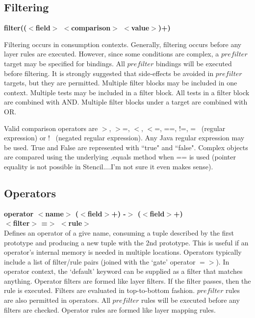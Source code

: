 \documentclass{article}
\begin{document}
\subsection{Filtering}
\textbf{filter(($<$field$>$ $<$comparison$>$ $<$value$>$)+)}

Filtering occurs in consumption contexts.  
Generally, filtering occurs before any layer rules are executed.  However,
since some conditions are complex, a $prefilter$ target may be specified for
bindings.  All $prefilter$ bindings will be executed before filtering.  It is strongly suggested
that side-effects be avoided in $prefilter$ targets, but they are permitted.
Multiple filter blocks may be included in one context.  Multiple tests may be included
 in a filter block.  All tests in a filter block are combined with AND.  Multiple filter
 blocks under a target are combined with OR.
 
Valid comparison operators are $>$, $>$=, $<$, $<$=, ==, !=, =~ (regular expression) or !~ (negated regular expression).
Any Java regular expression may be used.  True and False are represented with ``true" and ``false".
Complex objects are compared using the underlying .equals method when == is used 
(pointer equality is not possible in Stencil....I'm not sure it even makes sense).

\subsection{Operators}
\textbf{operator $<$name$>$ ($<$field$>$+) -$>$ ($<$field$>$+)}\\
\textbf{$<$filter$>$ =$>$ $<$rule$>$}\\
Defines an operator of a give name, consuming a tuple described by the first prototype and producing a new tuple with the 2nd prototype.  
This is useful if an operator's internal memory is needed in multiple locations.
Operators typically include a list of filter/rule pairs (joined with the `gate' operator $=>$).
In operator context, the `default' keyword can be supplied as a filter that matches anything.
Operator filters are formed like layer filters.  If the filter passes, then the rule is executed.  Filters are evaluated in top-to-bottom fashion.
$prefilter$ rules are also permitted in operators. All $prefilter$ rules will be executed before any filters are checked.
Operator rules are formed like layer mapping rules.
%
\end{document}
